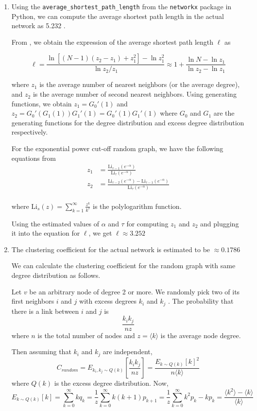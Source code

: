 \documentclass{article}
\newcommand{\Li}{\text{Li}}
\begin{document}
\begin{enumerate}
\item Using the \texttt{average\_shortest\_path\_length} from the \texttt{networkx} package in Python, we can compute the average shortest path length in the actual network as 5.232 .

From \cite{newman}, we obtain the expression of the average shortest path length $\ell$ as 

$$ \ell = \frac{\ln [ (N-1)(z_2 - z_1) + z_1^2 ] -  \ln z_1^2}{\ln z_2/z_1} \approx 1 + \frac{\ln N - \ln z_1}{\ln z_2 - \ln z_1}$$

where $z_1$ is the average number of nearest neighbors (or the average degree), and $z_2$ is the average number of second nearest neighbors. Using generating functions, we obtain $z_1 = G_0'(1)$ and $z_2 = G_0'(G_1(1))G_1'(1) = G_0'(1)G_1'(1) $ where $G_0$ and $G_1$ are the generating functions for the degree distribution and excess degree distribution respectively. 

For the exponential power cut-off random graph, we have the following equations from \cite{newman}
\begin{align}
z_1 &= \frac{\Li_{\tau - 1}(e^{-\alpha})}{\Li_{\tau }(e^{-\alpha})} \\
z_2 &= \frac{\Li_{\tau - 2}(e^{-\alpha})-\Li_{\tau - 1}(e^{-\alpha})}{\Li_{\tau }(e^{-\alpha})}\\
\end{align}

where $\Li_s(z) = \sum_{k=1}^\infty \frac{z^k}{k^s}$ is the polylogarithm function.  

Using the estimated values of $\alpha$ and $\tau$ for computing $z_1$ and $z_2$ and plugging it into the equation for $\ell$, we get $\ell \approx 3.252$

\item The clustering coefficient for the actual network is estimated to be $\approx 0.1786$

We can calculate the clustering coefficient for the random graph with same degree distribution as follows. 

Let $v$ be an arbitrary node of degree 2 or more. We randomly pick two of its first neighbors $i$ and $j$ with excess degrees $k_i$ and $k_j$ . The probability that there is a link between $i$ and $j$ is $$\frac{k_i k_j}{nz}$$
where $n$ is the total number of nodes and $z = \langle k \rangle$ is the average node degree.

Then assuming that $k_i$ and $k_j$ are independent, $$ C_{random} = E_{k_i, k_j \sim Q(k)}\left[\frac{k_i k_j}{nz}\right] = \frac{ E_{k \sim Q(k)}[k]^2 }{n \langle k \rangle}$$ where $Q(k)$ is the excess degree distribution. Now, $$ E_{k \sim Q(k)}[k] = \sum_{k=0}^\infty kq_k = \frac{1}{z} \sum_{k=0}^\infty k(k+1)p_{k+1} = \frac{1}{z} \sum_{k=0}^\infty k^2 p_{k} - k p_k = \frac{\langle k^2 \rangle - \langle k \rangle}{\langle k \rangle} $$


\end{enumerate}
\end{document}
